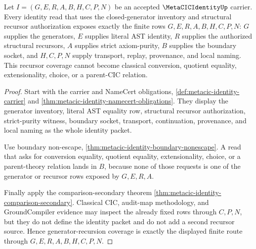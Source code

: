 \begin{theorem}
\label{thm:metacic-identity-generator-recursor-coverage}
Let $I=(G,E,R,A,B,H,C,P,N)$ be an accepted $\MetaCICIdentityUp$ carrier. Every identity read that uses the closed-generator inventory and structural recursor authorization exposes exactly the finite rows $G,E,R,A,B,H,C,P,N$: $G$ supplies the generators, $E$ supplies literal AST identity, $R$ supplies the authorized structural recursors, $A$ supplies strict axiom-purity, $B$ supplies the boundary socket, and $H,C,P,N$ supply transport, replay, provenance, and local naming. This recursor coverage cannot become classical conversion, quotient equality, extensionality, choice, or a parent-CIC relation.
\end{theorem}
\begin{proof}
Start with the carrier and NameCert obligations, \autoref{def:metacic-identity-carrier} and \autoref{thm:metacic-identity-namecert-obligations}. They display the generator inventory, literal AST equality row, structural recursor authorization, strict-purity witness, boundary socket, transport, continuation, provenance, and local naming as the whole identity packet.

Use boundary non-escape, \autoref{thm:metacic-identity-boundary-nonescape}. A read that asks for conversion equality, quotient equality, extensionality, choice, or a parent-theory relation lands in $B$, because none of those requests is one of the generator or recursor rows exposed by $G,E,R,A$.

Finally apply the comparison-secondary theorem \autoref{thm:metacic-identity-comparison-secondary}. Classical CIC, audit-map methodology, and GroundCompiler evidence may inspect the already fixed rows through $C,P,N$, but they do not define the identity packet and do not add a second recursor source. Hence generator-recursion coverage is exactly the displayed finite route through $G,E,R,A,B,H,C,P,N$.
\end{proof}

